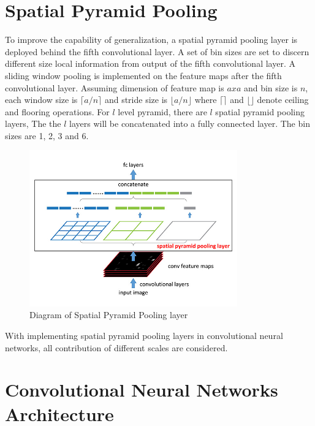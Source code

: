 \section{Spatial Pyramid Pooling}

To improve the capability of generalization, a spatial pyramid pooling layer is deployed behind the fifth convolutional layer. A set of bin sizes are set to discern different size local information from output of the fifth convolutional layer.  A sliding window pooling  is implemented on the feature maps after the fifth convolutional layer. Assuming dimension of feature map is $axa$ and bin size is $n$, each window size is $\lceil a/n \rceil$ and stride size is $\lfloor a/n \rfloor$ where $\lceil \rceil$ and $\lfloor \rfloor$ denote ceiling and flooring operations. For $l$ level pyramid, there are $l$ spatial pyramid pooling layers, The the $l$ layers will be concatenated into a fully connected layer. The bin sizes are 1, 2, 3 and 6.

\begin{figure}[!htb]
    \centering
	\includegraphics[width=0.8\textwidth]{sppnet.jpg}
    \caption{Diagram of Spatial Pyramid Pooling layer}%
    \label{fig:sppnet}%
\end{figure}

With implementing spatial pyramid pooling layers in convolutional neural networks, all contribution of different scales are considered.

\section{Convolutional Neural Networks Architecture}

